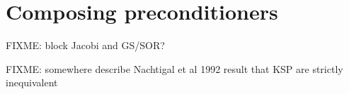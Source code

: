 \section{Composing preconditioners}

FIXME:  block Jacobi and GS/SOR?

FIXME: somewhere describe Nachtigal et al 1992 result that KSP are strictly inequivalent

\begin{comment}
> Hi all,
>
> Is weighted Jacobi available as a preconditioner ? I can't find it in the
> list of preconditioners. If not, what is the rationale between this choice
> ? It is pretty straightforward to code, so if it is not available I can do
> it without problem I guess, but I am just wondering. In the matrix-free
> case where SOR is not available by default, it may be better than pure
> Jacobi, and much easier to parallelize than SOR.
>
>   Timothee Nicolas

I believe what you are looking for is defined by the following options
  -ksp_type richardson
  -ksp_richardson_scale <value>
  -pc_type jacobi

Thanks,
  Dave May
\end{comment}

\begin{comment}
DAVE MAY petsc-users 2/9/2016:
...
To be sure your code is working correctly, test it using a preconditioner
which isn't dependent on the partitioning of the matrix. I would use these
options:
  -pc_type jacobi
  -ksp_monitor_true_residual

The last option is useful as it will report both the preconditioned
residual and the true residual. If the operator is singular, or close to
singular, gmres-ILU or gmres-BJacobi-ILU can report a preconditioned
residual which is small, but is orders of magnitude different from the true
residual.

Thanks,
  Dave
\end{comment}

